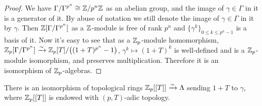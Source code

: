 \begin{proof}
We have $\Gamma/\Gamma^{p^n}\cong{\mathbb {Z}}/p^n{\mathbb {Z}}$ as an abelian group,
and the image of $\gamma\in\Gamma$
in it is a generator of it. By abuse of notation we still denote the image of
$\gamma\in\Gamma$ in it by $\gamma$.
Then ${\mathbb {Z}}[\Gamma/\Gamma^{p^n}]$ as a ${\mathbb {Z}}$-module is free of rank $p^n$
and $\{\gamma^k\}_{0\leq k\leq p^n-1}$ is a basis of it.
Now it's easy to see that as a ${\mathbb {Z}}_p$-module homomorphism,
${\mathbb {Z}}_p[\Gamma/\Gamma^{p^n}]\xrightarrow\sim{\mathbb {Z}}_p[T]/\big((1+T)^{p^n}-1\big)$,
$\gamma^k\mapsto(1+T)^k$ is well-defined and is a ${\mathbb {Z}}_p$-module isomorphism,
and preserves multiplication.
Therefore it is an isomorphism of ${\mathbb {Z}}_p$-algebras.
\end{proof}

\begin{prop}
\label{Iwasawa-alg-isom}
There is an isomorphism of topological rings
${\mathbb {Z}}_p[[T]]\xrightarrow\sim\Lambda$
sending $1+T$ to $\gamma$,
where ${\mathbb {Z}}_p[[T]]$ is endowed with $(p,T)$-adic topology.
\end{prop}

